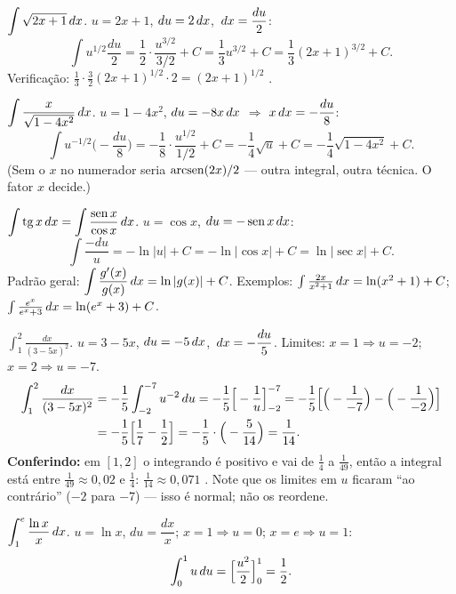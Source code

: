 \begin{exemplo}
$\displaystyle\int\sqrt{2x+1}\,dx$. \quad $u=2x+1$, $du=2\,dx$, $\,dx=\dfrac{du}{2}$:
\[
\int u^{1/2}\frac{du}{2}=\frac12\cdot\frac{u^{3/2}}{3/2}+C=\frac13u^{3/2}+C=\frac13(2x+1)^{3/2}+C .
\]
Verificação: $\frac13\cdot\frac32(2x+1)^{1/2}\cdot2=(2x+1)^{1/2}$ \ok.
\end{exemplo}

\begin{exemplo}
$\displaystyle\int\frac{x}{\sqrt{1-4x^2}}\,dx$. \quad $u=1-4x^2$, $du=-8x\,dx$ \;$\Rightarrow$\; $x\,dx=-\dfrac{du}{8}$:
\[
\int u^{-1/2}\Big(-\frac{du}{8}\Big)=-\frac18\cdot\frac{u^{1/2}}{1/2}+C=-\frac14\sqrt u+C=-\frac14\sqrt{1-4x^2}+C .
\]
(Sem o $x$ no numerador seria $\operatorname{arcsen}(2x)/2$ --- outra integral, outra técnica. O fator $x$ decide.)
\end{exemplo}

\begin{exemplo}
$\displaystyle\int\operatorname{tg} x\,dx=\int\frac{\operatorname{sen} x}{\cos x}\,dx$. \quad $u=\cos x$, $du=-\operatorname{sen} x\,dx$:
\[
\int\frac{-du}{u}=-\ln|u|+C=-\ln|\cos x|+C=\ln|\sec x|+C .
\]
Padrão geral: $\displaystyle\int\frac{g'(x)}{g(x)}\,dx=\ln|g(x)|+C$. Exemplos: $\int\frac{2x}{x^2+1}\,dx=\ln(x^2+1)+C$; $\int\frac{e^x}{e^x+3}\,dx=\ln(e^x+3)+C$.
\end{exemplo}

\begin{exemplo}
$\displaystyle\int_1^2\frac{dx}{(3-5x)^2}$. \quad $u=3-5x$, $du=-5\,dx$, $\,dx=-\dfrac{du}{5}$. Limites: $x=1\Rightarrow u=-2$; $x=2\Rightarrow u=-7$.
\begin{align*}
\int_1^2\frac{dx}{(3-5x)^2}&=-\frac15\int_{-2}^{-7}u^{-2}\,du=-\frac15\Big[-\frac1u\Big]_{-2}^{-7}
=-\frac15\Big[\Big(-\frac{1}{-7}\Big)-\Big(-\frac{1}{-2}\Big)\Big]\\
&=-\frac15\Big[\frac17-\frac12\Big]=-\frac15\cdot\Big(-\frac{5}{14}\Big)=\frac{1}{14}.
\end{align*}
\textbf{Conferindo:} em $[1,2]$ o integrando é positivo e vai de $\frac14$ a $\frac1{49}$, então a integral está entre $\frac1{49}\approx0{,}02$ e $\frac14$: $\frac1{14}\approx0{,}071$ \ok. Note que os limites em $u$ ficaram ``ao contrário'' ($-2$ para $-7$) --- isso é normal; não os reordene.
\end{exemplo}

\begin{exemplo}
$\displaystyle\int_1^{e}\frac{\ln x}{x}\,dx$. \quad $u=\ln x$, $du=\dfrac{dx}{x}$; $x=1\Rightarrow u=0$; $x=e\Rightarrow u=1$:
\[
\int_0^1 u\,du=\Big[\frac{u^2}{2}\Big]_0^1=\frac12 .
\]
\end{exemplo}

